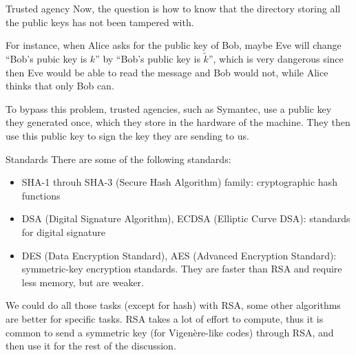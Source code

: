 \documentclass[a4paper]{article}
\begin{document}
\begin{parag}{Trusted agency}
     Now, the question is how to know that the directory storing all the public keys has not been tampered with. 

     For instance, when Alice asks for the public key of Bob, maybe Eve will change ``Bob's pubic key is $k$'' by ``Bob's public key is $\widetilde{k}$'', which is very dangerous since then Eve would be able to read the message and Bob would not, while Alice thinks that only Bob can.

     To bypass this problem, trusted agencies, such as Symantec, use a public key they generated once, which they store in the hardware of the machine. They then use this public key to sign the key they are sending to us.
\end{parag}

\begin{parag}{Standards}
     There are some of the following standards:
     \begin{itemize}
         \item SHA-1 throuh SHA-3 (Secure Hash Algorithm) family: cryptographic hash functions
         \item DSA (Digital Signature Algorithm), ECDSA (Elliptic Curve DSA): standards for digital signature
         \item DES (Data Encryption Standard), AES (Advanced Encryption Standard): symmetric-key encryption standards. They are faster than RSA and require less memory, but are weaker.
     \end{itemize}

     We could do all those tasks (except for hash) with RSA, some other algorithms are better for specific tasks. RSA takes a lot of effort to compute, thus it is common to send a symmetric key (for Vigenère-like codes) through RSA, and then use it for the rest of the discussion.
\end{parag}
\end{document}
